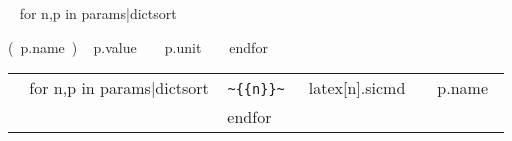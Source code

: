 \documentclass{article}
\begin{document}
\begin{description}
~{ for n,p in params|dictsort }~\item[\Q{~{{n}}~}] (~{{p.name}}~) ~{{ p.value }}~ ~{{ p.unit }}~
~{ endfor }~
\end{description}

\begin{tabular}[h]{r l r}
~{ for n,p in params|dictsort }~
\verb|~{{n}}~| & ~{{latex[n].sicmd}}~ & ~{{p.name}}~ \\
~{ endfor }~
\end{tabular}
\end{document}
